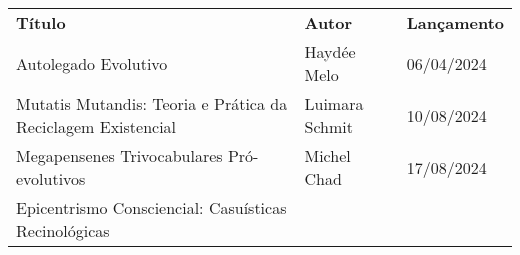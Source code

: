 \documentclass[
]{article}
\begin{document}
\begin{longtable}[]{@{}
  >{\raggedright\arraybackslash}p{}
  >{\raggedright\arraybackslash}p{}
  >{\raggedright\arraybackslash}p{}@{}}
\toprule\noalign{}
\begin{minipage}[b]{\linewidth}\centering
\textbf{Título}
\end{minipage} & \begin{minipage}[b]{\linewidth}\centering
\textbf{Autor}
\end{minipage} & \begin{minipage}[b]{\linewidth}\centering
\textbf{Lançamento}
\end{minipage} \\
\begin{minipage}[b]{\linewidth}\raggedright
Autolegado Evolutivo
\end{minipage} & \begin{minipage}[b]{\linewidth}\raggedright
Haydée Melo
\end{minipage} & \begin{minipage}[b]{\linewidth}\raggedright
06/04/2024
\end{minipage} \\
\begin{minipage}[b]{\linewidth}\raggedright
Mutatis Mutandis: Teoria e Prática da Reciclagem Existencial
\end{minipage} & \begin{minipage}[b]{\linewidth}\raggedright
Luimara Schmit
\end{minipage} & \begin{minipage}[b]{\linewidth}\raggedright
10/08/2024
\end{minipage} \\
\begin{minipage}[b]{\linewidth}\raggedright
Megapensenes Trivocabulares Pró-evolutivos
\end{minipage} & \begin{minipage}[b]{\linewidth}\raggedright
Michel Chad
\end{minipage} & \begin{minipage}[b]{\linewidth}\raggedright
17/08/2024
\end{minipage} \\
\begin{minipage}[b]{\linewidth}\raggedright
Epicentrismo Consciencial: Casuísticas Recinológicas
\end{minipage} & \begin{minipage}[b]{\linewidth}\raggedright

\end{minipage}
\end{longtable}
\end{document}
